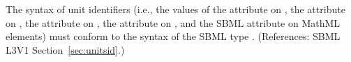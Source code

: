 The syntax of unit identifiers (i.e., the values of the 
attribute on \UnitDefinition, the  attribute on \Compartment,
the  attribute on \Parameter, the 
attribute on \Species, and the SBML  attribute on MathML
 elements) must conform to the syntax of the SBML type
.  (References: SBML L3V1 Section~\ref{sec:unitsid}.)
